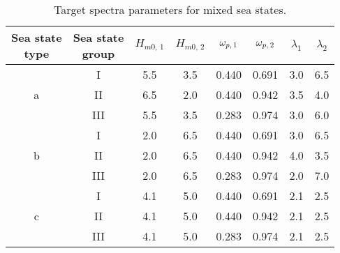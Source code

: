   \begin{table}[htbp]
    \begin{center}
      \begin{tabular}{|c | c  |c c c c c c|} \hline \hline
 \shortstack{Sea state\\ type} & \shortstack{Sea state \\group} &
 $H_{m0,\,1}$ & $H_{m0,\,2}$ & $\omega _{p,\,1}$ &    $\omega _{p,\,2}$  &
 $\lambda_{1}$ &   $\lambda_{2}$ \\  \hline
  &   I & 5.5  &   3.5  &   0.440  &   0.691  &   3.0  &  6.5 \\
a &  II & 6.5  &   2.0  &   0.440  &   0.942  &   3.5  &  4.0 \\
  & III & 5.5  &   3.5  &   0.283  &   0.974  &   3.0  &  6.0 \\ \hline
  &   I & 2.0  &   6.5  &   0.440  &   0.691  &   3.0  &  6.5 \\
b &  II & 2.0  &   6.5  &   0.440  &   0.942  &   4.0  &  3.5 \\
  & III & 2.0  &   6.5  &   0.283  &   0.974  &   2.0  &  7.0 \\ \hline
  &   I & 4.1  &   5.0  &   0.440  &   0.691  &   2.1  &  2.5 \\
c &  II & 4.1  &   5.0  &   0.440  &   0.942  &   2.1  &  2.5 \\
  & III & 4.1  &   5.0  &   0.283  &   0.974  &   2.1  &  2.5 \\  \hline \hline
      \end{tabular}
      \caption[Target spectra parameters for mixed sea states ~~]
{Target spectra parameters for mixed sea states.}
      \label{tab:soares-param}
    \end{center}
  \end{table}


%
%
%

